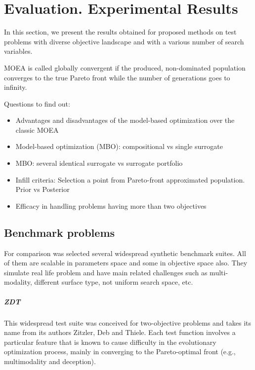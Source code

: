 \chapter{Evaluation. Experimental Results} 

In this section, we present the results obtained for proposed methods on test problems with diverse objective landscape and with a various number of search variables.

MOEA is called globally convergent if the produced, non-dominated population converges to the true Pareto front while the number of generations goes to infinity.

Questions to find out:
\begin{itemize}
    \item Advantages and disadvantages of the model-based optimization over the classic MOEA
    \item Model-based optimization (MBO): compositional vs single surrogate 
    \item MBO: several identical surrogate vs surrogate portfolio
    \item Infill criteria: Selection a point from Pareto-front approximated population. Prior vs Posterior
    \item Efficacy in handling problems having more than two objectives
\end{itemize}

\cite{kouwe2018benchmarking}

\section{Benchmark problems}
For comparison was selected several widespread synthetic benchmark suites. All of them are scalable in parameters space and some in objective space also. They simulate real life problem and have main related challenges such as multi-modality, different surface type, not uniform search space, etc.

    \paragraph{ZDT}
    This widespread test suite\cite{ZitzlerDT00} was conceived for two-objective problems and takes its name from its authors Zitzler, Deb and Thiele. Each test function involves a particular feature that is known to cause difficulty in the evolutionary optimization process, mainly in converging to the Pareto-optimal front (e.g., multimodality and deception).

